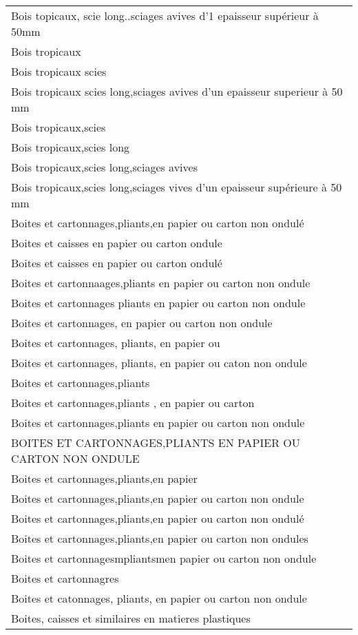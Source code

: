 \documentclass[
]{book}
\begin{document}
\begin{longtable}[t]{l}
Bois topicaux, scie long..sciages avives d'1 epaisseur supérieur à 50mm\\
Bois tropicaux\\
\addlinespace
Bois tropicaux scies\\
Bois tropicaux scies long,sciages avives d'un epaisseur superieur à 50 mm\\
Bois tropicaux,scies\\
Bois tropicaux,scies long\\
Bois tropicaux,scies long,sciages avives\\
\addlinespace
Bois tropicaux,scies long,sciages vives d'un epaisseur supérieure à 50 mm\\
Boites  et cartonnages,pliants,en papier ou carton non ondulé\\
Boites et caisses en papier ou carton ondule\\
Boites et caisses en papier ou carton ondulé\\
Boites et cartonnaages,pliants en papier ou carton non ondule\\
\addlinespace
Boites et cartonnages pliants en papier ou carton non ondule\\
Boites et cartonnages, en papier ou carton non ondule\\
Boites et cartonnages, pliants, en papier ou\\
Boites et cartonnages, pliants, en papier ou caton non ondule\\
Boites et cartonnages,pliants\\
\addlinespace
Boites et cartonnages,pliants , en papier ou carton\\
Boites et cartonnages,pliants en papier ou carton non ondule\\
BOITES ET CARTONNAGES,PLIANTS EN PAPIER OU CARTON NON ONDULE\\
Boites et cartonnages,pliants,en papier\\
Boites et cartonnages,pliants,en papier ou carton non ondule\\
\addlinespace
Boites et cartonnages,pliants,en papier ou carton non ondulé\\
Boites et cartonnages,pliants,en papier ou carton non ondules\\
Boites et cartonnagesmpliantsmen papier ou carton non ondule\\
Boites et cartonnagres\\
Boites et catonnages, pliants, en papier ou carton non ondule\\
\addlinespace
Boites, caisses et similaires en matieres plastiques\\

\end{longtable}
\end{document}
